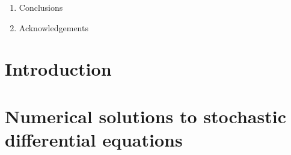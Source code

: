 \documentclass[manuscript,review,demo]{acmart}
\begin{document}
{\begin{enumerate}
\begin{enumerate}
\item The expected time savings. 
\item The variance reductions from simulations
\item The applicability of half precision and Kahan summation version. 
\item Can I get some C timings for path simulations using (savings from wider vectorisation and also lower precision calculations), using piecewise linear approximation with unions, or the LUT:
\begin{enumerate}
\item Double precision 
\item Single precision 
\item Half precision
\item Half precision with Kahan summation. 
\item Possibly both for the Euler and Milstein and GBM processes. 
\end{enumerate}
\item Calculate expected time savings. 
\end{enumerate}
\item Conclusions
\item Acknowledgements 
\end{enumerate}
}
\clearpage

\section{Introduction}
\label{sec:introduction}


\section{Numerical solutions to stochastic differential equations}
\label{sec:numerical_solutions_to_stochastic_differential_equations}
\end{document}
